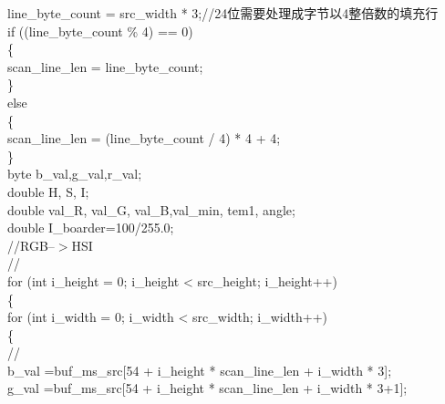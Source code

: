 ﻿\documentclass[12pt,a4paper,oneside]{book}
\begin{document}
\begin{enumerate}
\hspace*{4em}line\_byte\_count = src\_width * 3;//24位需要处理成字节以4整倍数的填充行\\
\hspace*{4em}if ((line\_byte\_count \% 4) == 0)\\
\hspace*{4em}\{\\
\hspace*{6em}scan\_line\_len = line\_byte\_count;\\
\hspace*{4em}\}\\
\hspace*{4em}else\\
\hspace*{4em}\{\\
\hspace*{6em}scan\_line\_len = (line\_byte\_count / 4) * 4 + 4;\\
\hspace*{4em}\}\\
\hspace*{4em}byte b\_val,g\_val,r\_val;\\
\hspace*{4em}double H, S, I;\\
\hspace*{4em}double val\_R, val\_G, val\_B,val\_min, tem1, angle;\\
\hspace*{4em}double I\_boarder=100/255.0;\\
\hspace*{4em}//RGB--$>$HSI\\
\hspace*{4em}//\\
\hspace*{4em}for (int i\_height = 0; i\_height < src\_height; i\_height++)\\
\hspace*{4em}\{\\
\hspace*{6em}for (int i\_width = 0; i\_width < src\_width; i\_width++)    \\
\hspace*{6em}\{ \\
\hspace*{8em}// \\
\hspace*{8em}b\_val =buf\_ms\_src[54 + i\_height * scan\_line\_len + i\_width * 3];\\
\hspace*{8em}g\_val =buf\_ms\_src[54 + i\_height * scan\_line\_len + i\_width * 3+1];\\

\end{enumerate}
\end{document}
